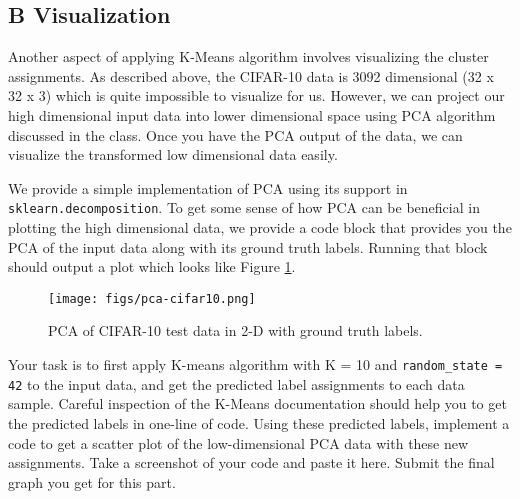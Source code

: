 \documentclass[11pt]{article}
\begin{document}
\subsection*{B Visualization} 
Another aspect of applying K-Means algorithm involves visualizing the cluster assignments. As described above, the CIFAR-10 data is 3092 dimensional (32 x 32 x 3) which is quite impossible to visualize for us. However, we can project our high dimensional input data into lower dimensional space using PCA algorithm discussed in the class. Once you have the PCA output of the data, we can visualize the transformed low dimensional data easily.

We provide a simple implementation of PCA using its support in \verb|sklearn.decomposition|. To get some sense of how PCA can be beneficial in plotting the high dimensional data, we provide a code block that provides you the PCA of the input data along with its ground truth labels. Running that block should output a plot which looks like Figure \ref{fig:my_label}. 

\begin{figure}[h]
    \centering
    \texttt{[image: figs/pca-cifar10.png]}
    \caption{PCA of CIFAR-10 test data in 2-D with ground truth labels.}
    \label{fig:my_label}
\end{figure}

Your task is to first apply K-means algorithm with K = 10 and \verb|random_state = 42| to the input data, and get the predicted label assignments to each data sample. Careful inspection of the K-Means documentation should help you to get the predicted labels in one-line of code. Using these predicted labels, implement a code to get a scatter plot of the low-dimensional PCA data with these new assignments. Take a screenshot of your code and paste it here. Submit the final graph you get for this part. \hfill
\end{document}

